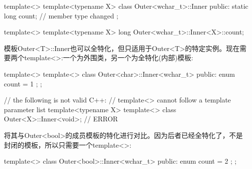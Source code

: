 \begin{cpp}
template<>
template<typename X>
class Outer<wchar_t>::Inner {
	public:
	static long count; // member type changed
};

template<>
	template<typename X>
	long Outer<wchar_t>::Inner<X>::count;
\end{cpp}

模板Outer<T>::Inner也可以全特化，但只适用于Outer<T>的特定实例。现在需要两个template<>:一个为外围类，另一个为全特化(内部)模板:

\begin{cpp}
template<>
	template<>
	class Outer<char>::Inner<wchar_t> {
		public:
		enum { count = 1 };
	};

// the following is not valid C++:
// template<> cannot follow a template parameter list
template<typename X>
template<> class Outer<X>::Inner<void>; // ERROR
\end{cpp}

将其与Outer<bool>的成员模板的特化进行对比。因为后者已经全特化了，不是封闭的模板，所以只需要一个template<>:

\begin{cpp}
template<>
class Outer<bool>::Inner<wchar_t> {
	public:
	enum { count = 2 };
};
\end{cpp}
































